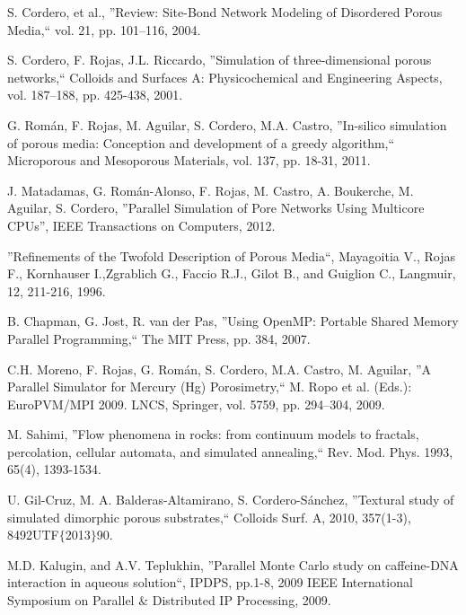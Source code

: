 
%




\begin{thebibliography}{9}
 \bigskip
 \barra
 \bigskip

S. Cordero, et al., ''Review: Site-Bond Network Modeling of Disordered Porous Media,`` vol. 21, pp. 101–116, 2004.

S. Cordero, F. Rojas, J.L. Riccardo, ''Simulation of three-dimensional porous networks,`` Colloids and Surfaces A: Physicochemical and Engineering Aspects, vol. 187–188, pp. 425-438, 2001. 

G. Román, F. Rojas, M. Aguilar, S. Cordero, M.A. Castro, ''In-silico simulation of porous media: Conception and development of a greedy algorithm,`` Microporous and Mesoporous Materials, vol. 137, pp. 18-31, 2011. 

J. Matadamas, G. Román-Alonso, F. Rojas, M. Castro, A. Boukerche, M. Aguilar, S. Cordero, ''Parallel Simulation of Pore Networks Using Multicore CPUs”, IEEE Transactions on Computers, 2012. 

''Refinements of the Twofold Description of Porous Media``, Mayagoitia V., Rojas F., Kornhauser I.,Zgrablich G., Faccio R.J., Gilot B., and Guiglion C., Langmuir, 12, 211-216, 1996. 

B. Chapman, G. Jost, R. van der Pas, ''Using OpenMP: Portable Shared Memory Parallel Programming,`` The MIT Press, pp. 384, 2007. 

C.H. Moreno, F. Rojas, G. Román, S. Cordero, M.A. Castro, M. Aguilar, ''A Parallel Simulator for Mercury (Hg) Porosimetry,`` M. Ropo et al. (Eds.): EuroPVM/MPI 2009. LNCS, Springer, vol. 5759, pp. 294–304, 2009.

M. Sahimi, ''Flow phenomena in rocks: from continuum models to fractals, percolation, cellular automata, and simulated annealing,`` Rev. Mod. Phys. 1993, 65(4), 1393-1534. 

U. Gil-Cruz, M. A. Balderas-Altamirano, S. Cordero-Sánchez, ''Textural study of simulated dimorphic porous substrates,`` Colloids Surf. A, 2010, 357(1-3), 8492UTF$\{$2013$\}$90. 

M.D. Kalugin, and A.V. Teplukhin, ''Parallel Monte Carlo study on caffeine-DNA interaction in aqueous solution``, IPDPS, pp.1-8, 2009 IEEE International Symposium on Parallel $\&$ Distributed IP Processing, 2009. 


\end{thebibliography}
